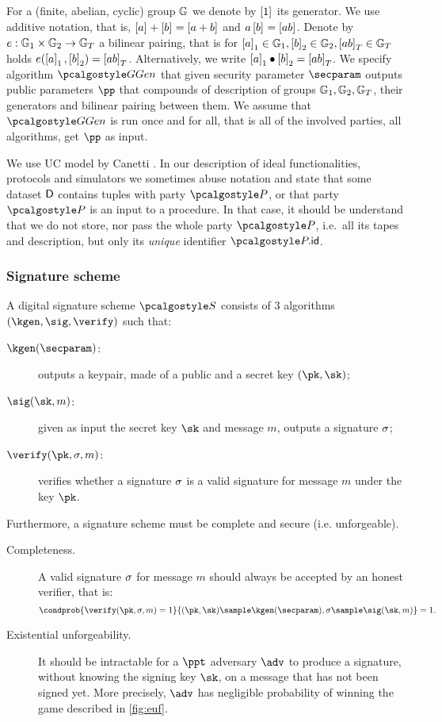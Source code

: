 \documentclass[runningheads,10pt]{llncs}
\numberwithin{equation}{section}
\begin{document}
For a (finite, abelian, cyclic) group $\mathbb{G}$ we denote by $\left[1 \right]_{}$ its
generator. We use additive notation, that is,
$\left[a \right]_{} + \left[b \right]_{} = \left[a + b \right]_{}$ and $a \left[b \right]_{}= \left[ab \right]_{}$. Denote by
$e: \mathbb{G}_1 \times \mathbb{G}_2 \to \mathbb{G}_T$ a bilinear pairing, that is for
$\left[a \right]_{1} \in \mathbb{G}_1, \left[b \right]_{2} \in \mathbb{G}_2, \left[ab \right]_{T} \in \mathbb{G}_T$ holds
$e(\left[a \right]_{1}, \left[b \right]_{2}) = \left[ab \right]_{T}$. Alternatively, we write
$\left[a \right]_{1} \bullet \left[b \right]_{2} = \left[ab \right]_{T}$. We specify algorithm $\ggen$ that given
security parameter $\secparam$ outputs public parameters $\pp$ that compounds of
description of groups $\mathbb{G}_1, \mathbb{G}_2, \mathbb{G}_T$, their generators and bilinear
pairing between them. We assume that $\ggen$ is run once and for all, that is
all of the involved parties, all algorithms, get $\pp$ as input.

We use UC model by Canetti \cite{EPRINT:Canetti00}. In our description of ideal
functionalities, protocols and simulators we sometimes abuse notation and state
that some dataset $\mathsf{D}$ contains tuples with party $\party$, or that
party $\party$ is an input to a procedure. In that case, it should be understand
that we do not store, nor pass the whole party $\party$, i.e.~all its tapes and
description, but only its \emph{unique} identifier $\partyid{\party}$.

\subsubsection{Signature scheme}
A digital signature scheme $\SIG$ consists of 3 algorithms $(\kgen, \sig,
\verify)$ such that:
\begin{description}
  \item[$\kgen(\secparam)$:] outputs a keypair, made of a public and a secret
  key $(\pk, \sk)$;
  \item[$\sig(\sk, m)$:] given as input the secret key $\sk$ and message $m$,
  outputs a signature $\sigma$;
  \item[$\verify(\pk, \signature, m)$:] verifies whether a signature
  $\sigma$ is a valid signature for message $m$ under the key $\pk$.
\end{description}

Furthermore, a signature scheme must be complete and secure (i.e. unforgeable).
\begin{description}
  \item[Completeness.] A valid signature $\sigma$ for message $m$ should
  always be accepted by an honest verifier, that is:
  \[
  \condprob{\verify(\pk, \signature, m) = 1}{(\pk, \sk) \sample
  \kgen(\secparam), \signature \sample \sig(\sk, m)} = 1.
  \]
  \item[Existential unforgeability.] It should be intractable for a $\ppt$
  adversary $\adv$ to produce a signature, without knowing the signing key
  $\sk$, on a message that has not been signed yet. More precisely, $\adv$ has
  negligible probability of winning the game described in \cref{fig:euf}.
\end{description}
\end{document}
